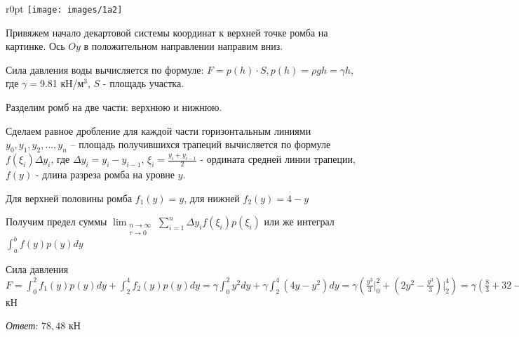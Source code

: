 \begin{minipage}{\linewidth}

    \begin{wrapfigure}{r}{0pt}
        \texttt{[image: images/1a2]}
    \end{wrapfigure}

    Привяжем начало декартовой системы координат к верхней точке ромба на картинке. Ось $Oy$ в положительном направлении направим вниз.

    Сила давления воды вычисляется по формуле: $F = p(h) \cdot S, p(h) = \rho g h = \gamma h$, где $\gamma = $9.81 кН/м$^3$, $S$ - площадь участка.

    Разделим ромб на две части: верхнюю и нижнюю.

    Сделаем равное дробление для каждой части горизонтальным линиями $y_0, y_1, y_2, \dots, y_n$ -- площадь получившихся трапеций вычисляется по формуле $f(\xi_i) \Delta y_i$,
    где $\Delta y_i = y_i - y_{i - 1}$, $\displaystyle \xi_i = \frac{y_i + y_{i - 1}}{2}$ - ордината средней линии трапеции, $f(y)$ - длина разреза ромба на уровне $y$.

    Для верхней половины ромба $f_1(y) = y$, для нижней $f_2(y) = 4 - y$

    Получим предел суммы $\displaystyle \lim_{\substack{n \to \infty \\ \tau \to 0}} \sum_{i = 1}^{n} \Delta y_i f(\xi_i) p(\xi_i)$ или же интеграл
    $\displaystyle \int_a^b f(y) p(y) dy$

    Сила давления $\displaystyle F = \int_0^2 f_1(y) p(y) dy + \int_2^4 f_2(y) p(y) dy = \gamma \int_0^2 y^2 dy + \gamma \int_2^4 (4y - y^2) dy =
    \gamma (\frac{y^3}{3} \Big|_0^2 + (2y^2 - \frac{y^3}{3}) \Big|_2^4) = \gamma (\frac{8}{3} + 32 - \frac{64}{3} - 8 + \frac{8}{3}) = 8 \gamma = 78,48$ кН


\end{minipage}

\vspace{14mm}

\textit{Ответ}: $78,48$ кН
\clearpage
